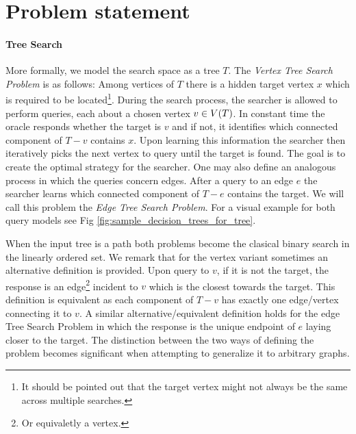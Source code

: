 \section{Problem statement}
\paragraph{Tree Search}
More formally, we model the search space as a tree $T$. The \textit{Vertex Tree Search Problem} is as follows: Among vertices of $T$ there is a hidden target vertex $x$ which is required to be located\footnote{It should be pointed out that the target vertex might not always be the same across multiple searches.}. During the search process, the searcher is allowed to perform queries, each about a chosen vertex $v\in V\mathopen{}\left( T \right)$. In constant time the oracle responds whether the target is $v$ and if not, it identifies which connected component of $T-v$ contains $x$. Upon learning this information the searcher then iteratively picks the next vertex to query until the target is found. The goal is to create the optimal strategy for the searcher. 
One may also define an analogous process in which the queries concern edges. After a query to an edge $e$ the searcher learns which connected component of $T-e$ contains the target. We will call this problem the \textit{Edge Tree Search Problem}. For a visual example for both query models see Fig \ref{fig:sample_decision_trees_for_tree}.  


When the input tree is a path both problems become the clasical binary search in the linearly ordered set.
We remark that for the vertex variant sometimes an alternative definition is provided. Upon query to $v$, if it is not the target, the response is an edge\footnote{Or equivaletly a vertex.} incident to $v$ which is the closest towards the target. This definition is equivalent as each component of $T-v$ has exactly one edge/vertex connecting it to $v$. A similar alternative/equivalent definition holds for the edge Tree Search Problem in which the response is the unique endpoint of $e$ laying closer to the target. The distinction between the two ways of defining the problem becomes significant when attempting to generalize it to arbitrary graphs.


